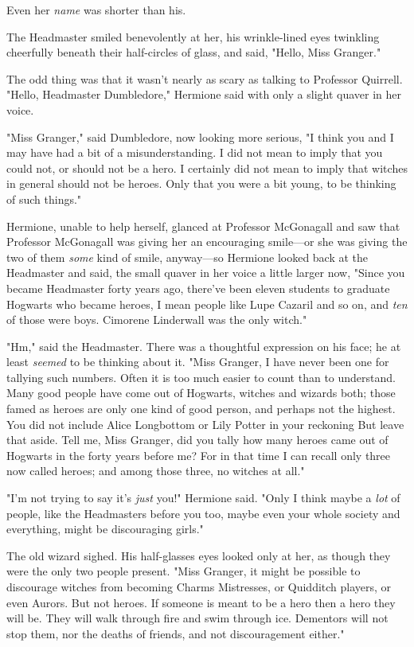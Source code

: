 Even her \emph{name} was shorter than his.

The Headmaster smiled benevolently at her, his wrinkle-lined eyes twinkling
cheerfully beneath their half-circles of glass, and said, "Hello, Miss Granger."

The odd thing was that it wasn't nearly as scary as talking to Professor
Quirrell. "Hello, Headmaster Dumbledore," Hermione said with only a slight
quaver in her voice.

"Miss Granger," said Dumbledore, now looking more serious, "I think you and I
may have had a bit of a misunderstanding. I did not mean to imply that you
could not, or should not be a hero. I certainly did not mean to imply that
witches in general should not be heroes. Only that you were{\el} a bit
young, to be thinking of such things."

Hermione, unable to help herself, glanced at Professor McGonagall and saw that
Professor McGonagall was giving her an encouraging smile---or she was giving
the two of them \emph{some} kind of smile, anyway---so Hermione looked back at
the Headmaster and said, the small quaver in her voice a little larger now,
"Since you became Headmaster forty years ago, there've been eleven students to
graduate Hogwarts who became heroes, I mean people like Lupe Cazaril and so on,
and \emph{ten} of those were boys. Cimorene Linderwall was the only witch."

"Hm," said the Headmaster. There was a thoughtful expression on his face; he at
least \emph{seemed} to be thinking about it. "Miss Granger, I have never been
one for tallying such numbers. Often it is too much easier to count than to
understand. Many good people have come out of Hogwarts, witches and wizards
both; those famed as heroes are only one kind of good person, and perhaps not
the highest. You did not include Alice Longbottom or Lily Potter in your
reckoning{\el} But leave that aside. Tell me, Miss Granger, did you tally
how many heroes came out of Hogwarts in the forty years before me? For in that
time I can recall only three now called heroes; and among those three, no
witches at all."

"I'm not trying to say it's \emph{just} you!" Hermione said. "Only I think
maybe a \emph{lot} of people, like the Headmasters before you too, maybe even
your whole society and everything, might be discouraging girls."

The old wizard sighed. His half-glasses eyes looked only at her, as though they
were the only two people present. "Miss Granger, it might be possible to
discourage witches from becoming Charms Mistresses, or Quidditch players, or
even Aurors. But not heroes. If someone is meant to be a hero then a hero they
will be. They will walk through fire and swim through ice. Dementors will not
stop them, nor the deaths of friends, and not discouragement either."

